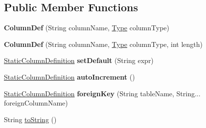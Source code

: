 \subsection*{Public Member Functions}
\begin{DoxyCompactItemize}
\item 
\mbox{\label{classcom_1_1mysql_1_1cj_1_1xdevapi_1_1_column_def_a17b41b3c7326b878f6b4de4cd4a53484}} 
{\bfseries Column\+Def} (String column\+Name, \mbox{\hyperlink{enumcom_1_1mysql_1_1cj_1_1xdevapi_1_1_type}{Type}} column\+Type)
\item 
\mbox{\label{classcom_1_1mysql_1_1cj_1_1xdevapi_1_1_column_def_a7ef40be3a09cd586c0612d2cf182d7b6}} 
{\bfseries Column\+Def} (String column\+Name, \mbox{\hyperlink{enumcom_1_1mysql_1_1cj_1_1xdevapi_1_1_type}{Type}} column\+Type, int length)
\item 
\mbox{\label{classcom_1_1mysql_1_1cj_1_1xdevapi_1_1_column_def_a2c34dd13c55b62ebb84e7c98a0d01ad3}} 
\mbox{\hyperlink{interfacecom_1_1mysql_1_1cj_1_1xdevapi_1_1_column_definition_1_1_static_column_definition}{Static\+Column\+Definition}} {\bfseries set\+Default} (String expr)
\item 
\mbox{\label{classcom_1_1mysql_1_1cj_1_1xdevapi_1_1_column_def_af5d7d177c86260c52e75c44a2863330e}} 
\mbox{\hyperlink{interfacecom_1_1mysql_1_1cj_1_1xdevapi_1_1_column_definition_1_1_static_column_definition}{Static\+Column\+Definition}} {\bfseries auto\+Increment} ()
\item 
\mbox{\label{classcom_1_1mysql_1_1cj_1_1xdevapi_1_1_column_def_a55fde7312a45fd6dc7bca76406c018cd}} 
\mbox{\hyperlink{interfacecom_1_1mysql_1_1cj_1_1xdevapi_1_1_column_definition_1_1_static_column_definition}{Static\+Column\+Definition}} {\bfseries foreign\+Key} (String table\+Name, String... foreign\+Column\+Name)
\item 
String \mbox{\hyperlink{classcom_1_1mysql_1_1cj_1_1xdevapi_1_1_column_def_ae26162c5f6538de1eec31032e130593b}{to\+String}} ()
\end{DoxyCompactItemize}
